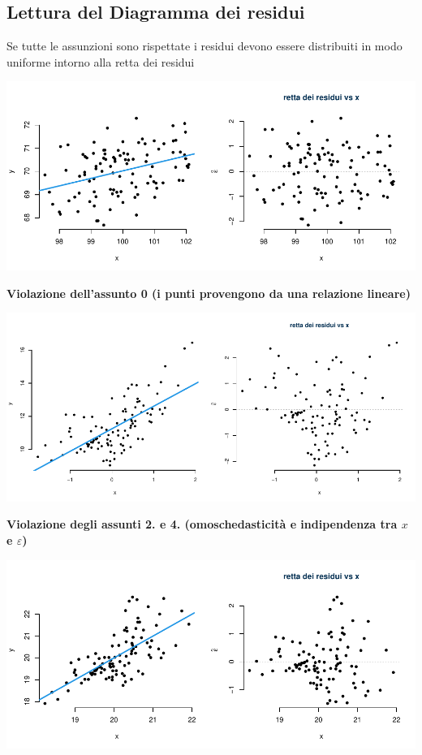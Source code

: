 \documentclass[
  11pt,
]{book}
\theoremstyle{mytheoremstyle}
\theoremstyle{mydefstyle}
\begin{document}
\subsection{Lettura del Diagramma dei residui}\label{lettura-del-diagramma-dei-residui}

Se tutte le assunzioni sono rispettate i residui devono essere distribuiti
in modo uniforme intorno alla retta dei residui

\begin{center}\includegraphics{Appunti_di_Statistica_2025_files/figure-latex/18-regressione-II-13-1} \end{center}

\textbf{Violazione dell'assunto 0 (i punti provengono da una relazione lineare)}

\begin{center}\includegraphics{Appunti_di_Statistica_2025_files/figure-latex/18-regressione-II-15-1} \end{center}

\textbf{Violazione degli assunti 2. e 4. (omoschedasticità e indipendenza tra \(x\) e \(\varepsilon\))}

\begin{center}\includegraphics{Appunti_di_Statistica_2025_files/figure-latex/18-regressione-II-17-1} \end{center}
\end{document}
